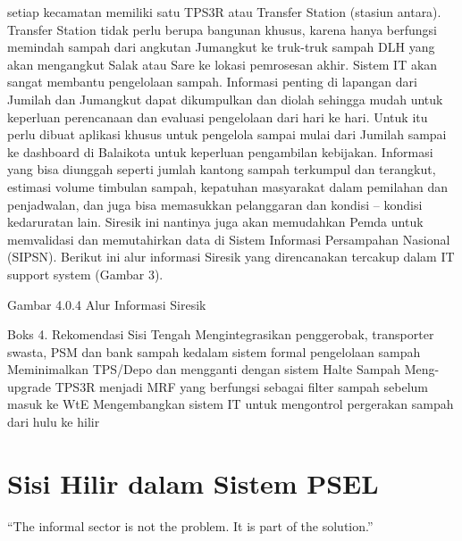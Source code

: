 \documentclass[
  letterpaper,
  DIV=11,
  numbers=noendperiod]{scrreprt}
\begin{document}
setiap kecamatan memiliki satu TPS3R atau Transfer Station (stasiun
antara). Transfer Station tidak perlu berupa bangunan khusus, karena
hanya berfungsi memindah sampah dari angkutan Jumangkut ke truk-truk
sampah DLH yang akan mengangkut Salak atau Sare ke lokasi pemrosesan
akhir. Sistem IT akan sangat membantu pengelolaan sampah. Informasi
penting di lapangan dari Jumilah dan Jumangkut dapat dikumpulkan dan
diolah sehingga mudah untuk keperluan perencanaan dan evaluasi
pengelolaan dari hari ke hari. Untuk itu perlu dibuat aplikasi khusus
untuk pengelola sampai mulai dari Jumilah sampai ke dashboard di
Balaikota untuk keperluan pengambilan kebijakan. Informasi yang bisa
diunggah seperti jumlah kantong sampah terkumpul dan terangkut, estimasi
volume timbulan sampah, kepatuhan masyarakat dalam pemilahan dan
penjadwalan, dan juga bisa memasukkan pelanggaran dan kondisi -- kondisi
kedaruratan lain. Siresik ini nantinya juga akan memudahkan Pemda untuk
memvalidasi dan memutahirkan data di Sistem Informasi Persampahan
Nasional (SIPSN). Berikut ini alur informasi Siresik yang direncanakan
tercakup dalam IT support system (Gambar 3).

Gambar 4.0.4 Alur Informasi Siresik

Boks 4. Rekomendasi Sisi Tengah Mengintegrasikan penggerobak,
transporter swasta, PSM dan bank sampah kedalam sistem formal
pengelolaan sampah Meminimalkan TPS/Depo dan mengganti dengan sistem
Halte Sampah Meng-upgrade TPS3R menjadi MRF yang berfungsi sebagai
filter sampah sebelum masuk ke WtE Mengembangkan sistem IT untuk
mengontrol pergerakan sampah dari hulu ke hilir


\chapter{Sisi Hilir dalam Sistem
PSEL}\label{sisi-hilir-dalam-sistem-psel}

``The informal sector is not the problem. It is part of the solution.''
\end{document}
